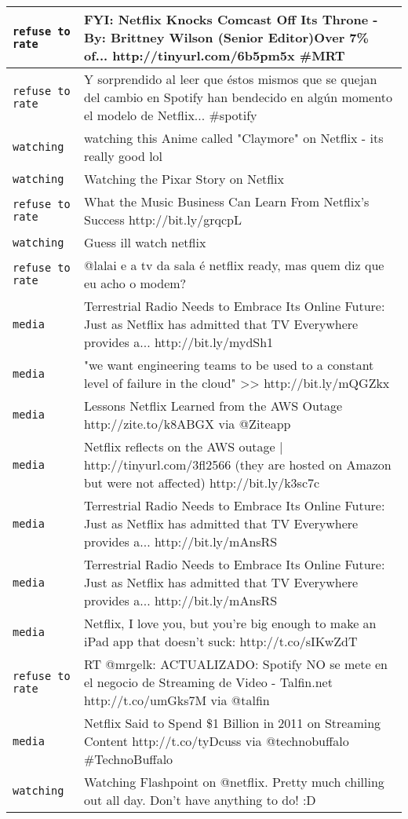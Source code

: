 \begin{center}
\begin{longtable}{|l|p{120mm}|}
      \tabularnewline\hline
         \texttt{refuse to rate} & FYI: Netflix Knocks Comcast Off Its Throne - By: Brittney Wilson (Senior Editor)Over 7\% of... http://tinyurl.com/6b5pm5x \#MRT
      \tabularnewline\hline
         \texttt{refuse to rate} & Y sorprendido al leer que éstos mismos que se quejan del cambio en Spotify han bendecido en algún momento el modelo de Netflix... \#spotify
      \tabularnewline\hline
         \texttt{watching} & watching this Anime called "Claymore" on Netflix - its really good lol
      \tabularnewline\hline
         \texttt{watching} & Watching the Pixar Story on Netflix
      \tabularnewline\hline
         \texttt{refuse to rate} & What the Music Business Can Learn From Netflix's Success http://bit.ly/grqcpL
      \tabularnewline\hline
         \texttt{watching} & Guess ill watch netflix
      \tabularnewline\hline
         \texttt{refuse to rate} & @lalai e a tv da sala é netflix ready, mas quem diz que eu acho o modem?
      \tabularnewline\hline
         \texttt{media} & Terrestrial Radio Needs to Embrace Its Online Future: Just as Netflix has admitted that TV Everywhere provides a... http://bit.ly/mydSh1
      \tabularnewline\hline
         \texttt{media} & "we want engineering teams to be used to a constant level of failure in the cloud" >> http://bit.ly/mQGZkx
      \tabularnewline\hline
         \texttt{media} & Lessons Netflix Learned from the AWS Outage http://zite.to/k8ABGX via @Ziteapp
      \tabularnewline\hline
         \texttt{media} & Netflix reflects on the AWS outage | http://tinyurl.com/3fl2566 (they are hosted on Amazon but were not affected) http://bit.ly/k3sc7c
      \tabularnewline\hline
         \texttt{media} & Terrestrial Radio Needs to Embrace Its Online Future: Just as Netflix has admitted that TV Everywhere provides a... http://bit.ly/mAnsRS
      \tabularnewline\hline
         \texttt{media} & Terrestrial Radio Needs to Embrace Its Online Future: Just as Netflix has admitted that TV Everywhere provides a... http://bit.ly/mAnsRS
      \tabularnewline\hline
         \texttt{media} & Netflix, I love you, but you're big enough to make an iPad app that doesn't suck: http://t.co/sIKwZdT
      \tabularnewline\hline
         \texttt{refuse to rate} & RT @mrgelk: ACTUALIZADO: Spotify NO se mete en el negocio de Streaming de Video - Talfin.net http://t.co/umGks7M via @talfin
      \tabularnewline\hline
         \texttt{media} & Netflix Said to Spend \$1 Billion in 2011 on Streaming Content http://t.co/tyDcuss via @technobuffalo \#TechnoBuffalo
      \tabularnewline\hline
         \texttt{watching} & Watching Flashpoint on @netflix. Pretty much chilling out all day. Don't have anything to do! :D

\end{longtable}
\end{center}
